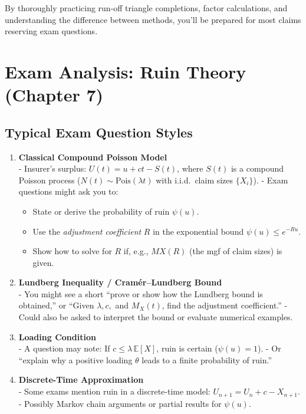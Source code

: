 \documentclass[13pt,a4paper]{article}
\begin{document}
\noindent
By thoroughly practicing run-off triangle completions, factor calculations, and understanding the difference between methods, you’ll be prepared for most claims reserving exam questions.

\section{Exam Analysis: Ruin Theory (Chapter 7)}
\label{sec:ruin_exam_analysis}

\subsection{Typical Exam Question Styles}
\begin{enumerate}
  \item \textbf{Classical Compound Poisson Model}\\
    - Insurer’s surplus: \(U(t) = u + ct - S(t)\), where \(S(t)\) is a compound Poisson process (\(N(t)\sim \mathrm{Pois}(\lambda t)\) with i.i.d.\ claim sizes \(\{X_i\}\)).
    - Exam questions might ask you to:
      \begin{itemize}
        \item State or derive the probability of ruin \(\psi(u)\).
        \item Use the \emph{adjustment coefficient} \(R\) in the exponential bound \(\psi(u) \le e^{-Ru}\).
        \item Show how to solve for \(R\) if, e.g., \(MX(R)\) (the mgf of claim sizes) is given.
      \end{itemize}

  \item \textbf{Lundberg Inequality / Cramér--Lundberg Bound}\\
    - You might see a short “prove or show how the Lundberg bound is obtained,” or “Given \(\lambda, c,\) and \(M_X(t)\), find the adjustment coefficient.”  
    - Could also be asked to interpret the bound or evaluate numerical examples.

  \item \textbf{Loading Condition}\\
    - A question may note: If \(c \le \lambda\,\mathbb{E}[X]\), ruin is certain (\(\psi(u)=1\)). 
    - Or “explain why a positive loading \(\theta\) leads to a finite probability of ruin.”

  \item \textbf{Discrete-Time Approximation}\\
    - Some exams mention ruin in a discrete-time model: \(U_{n+1} = U_n + c - X_{n+1}\).  
    - Possibly Markov chain arguments or partial results for \(\psi(u)\).


\end{enumerate}
\end{document}
